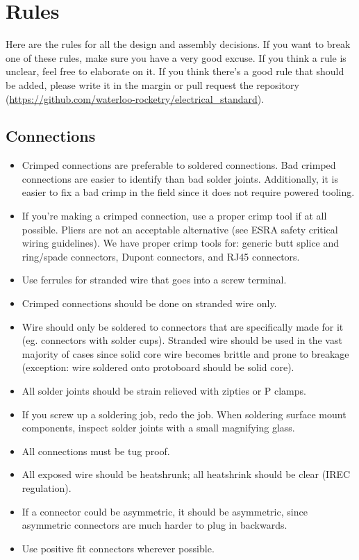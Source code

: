 \documentclass{article}
\begin{document}
\section{Rules}
Here are the rules for all the design and assembly decisions. If you want to break one of these rules, make sure you have a very good excuse. If you think a rule is unclear, feel free to elaborate on it. If you think there's a good rule that should be added, please write it in the margin or pull request the repository (\url{https://github.com/waterloo-rocketry/electrical\_standard}).

\subsection{Connections}
\begin{itemize}
\item Crimped connections are preferable to soldered connections. Bad crimped connections are easier to identify than bad solder joints. Additionally, it is easier to fix a bad crimp in the field since it does not require powered tooling.
\item If you're making a crimped connection, use a proper crimp tool if at all possible. Pliers are not an acceptable alternative (see ESRA safety critical wiring guidelines). We have proper crimp tools for: generic butt splice and ring/spade connectors, Dupont connectors, and RJ45 connectors.
\item Use ferrules for stranded wire that goes into a screw terminal.
\item Crimped connections should be done on stranded wire only.
\item Wire should only be soldered to connectors that are specifically made for it (eg. connectors with solder cups). Stranded wire should be used in the vast majority of cases since solid core wire becomes brittle and prone to breakage (exception: wire soldered onto protoboard should be solid core).
\item All solder joints should be strain relieved with zipties or P clamps.
\item If you screw up a soldering job, redo the job. When soldering surface mount components, inspect solder joints with a small magnifying glass.
\item All connections must be tug proof.
\item All exposed wire should be heatshrunk; all heatshrink should be clear (IREC regulation).
\item If a connector could be asymmetric, it should be asymmetric, since asymmetric connectors are much harder to plug in backwards.
\item Use positive fit connectors wherever possible.
\end{itemize}
\end{document}
